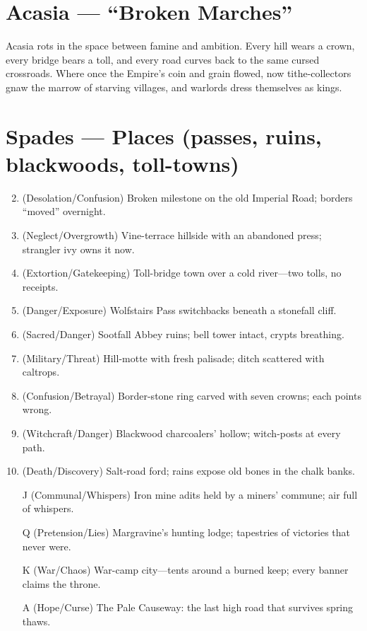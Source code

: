 \section{Acasia --- ``Broken Marches''}
\label{chap:acasia}

\begin{tcolorbox}[colback=black!3,colframe=black!40!white,title={Famine \& Ambition}]
Acasia rots in the space between famine and ambition. Every hill wears a crown, every bridge bears a toll, and every road curves back to the same cursed crossroads. Where once the Empire's coin and grain flowed, now tithe-collectors gnaw the marrow of starving villages, and warlords dress themselves as kings.
\end{tcolorbox}

\section*{Spades --- Places (passes, ruins, blackwoods, toll-towns)}
\label{sec:acasia-places}
\begin{enumerate}
\setcounter{enumi}{1}
\item (Desolation/Confusion) Broken milestone on the old Imperial Road; borders ``moved'' overnight.
\item (Neglect/Overgrowth) Vine-terrace hillside with an abandoned press; strangler ivy owns it now.
\item (Extortion/Gatekeeping) Toll-bridge town over a cold river---two tolls, no receipts.
\item (Danger/Exposure) Wolfstairs Pass switchbacks beneath a stonefall cliff.
\item (Sacred/Danger) Sootfall Abbey ruins; bell tower intact, crypts breathing.
\item (Military/Threat) Hill-motte with fresh palisade; ditch scattered with caltrops.
\item (Confusion/Betrayal) Border-stone ring carved with seven crowns; each points wrong.
\item (Witchcraft/Danger) Blackwood charcoalers' hollow; witch-posts at every path.
\item (Death/Discovery) Salt-road ford; rains expose old bones in the chalk banks.
\item[J] (Communal/Whispers) Iron mine adits held by a miners' commune; air full of whispers.
\item[Q] (Pretension/Lies) Margravine's hunting lodge; tapestries of victories that never were.
\item[K] (War/Chaos) War-camp city---tents around a burned keep; every banner claims the throne.
\item[A] (Hope/Curse) The Pale Causeway: the last high road that survives spring thaws.
\end{enumerate}

